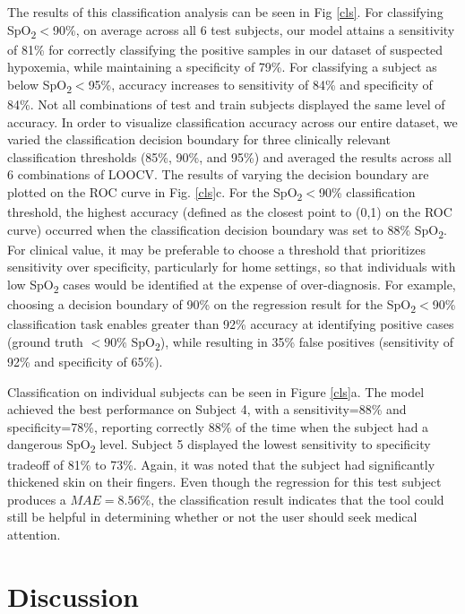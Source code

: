 \documentclass[12pt]{article}
\begin{document}
The results of this classification analysis can be seen in Fig \ref{cls}. For classifying SpO\textsubscript{2}$<$90\%,
on average across all 6 test subjects, our model attains a sensitivity of 81\% for correctly classifying the positive samples in our dataset of suspected hypoxemia,
while maintaining a specificity of 79\%.
For classifying a subject as below SpO\textsubscript{2}$<$95\%, accuracy increases to sensitivity of 84\% and specificity of 84\%.
Not all combinations of test and train subjects displayed the same level of accuracy. In order to visualize classification accuracy across our entire dataset, we varied the classification decision boundary for three clinically relevant classification thresholds (85\%, 90\%, and 95\%) and averaged the results across all 6 combinations of LOOCV.  The results of varying the decision boundary are plotted on the ROC curve in Fig. \ref{cls}c.  For the SpO\textsubscript{2}$<$90\% classification threshold, the highest accuracy (defined as the closest point to (0,1) on the ROC curve) occurred when the classification decision boundary was set to 88\% SpO\textsubscript{2}.  For clinical value, it may be preferable to choose a threshold that prioritizes sensitivity over specificity, particularly for home settings, so that individuals with low SpO\textsubscript{2} cases would be identified at the expense of over-diagnosis.
For example, choosing a decision boundary of 90\% on the regression result for the SpO\textsubscript{2}$<$90\% classification task enables greater than 92\% accuracy at identifying positive cases (ground truth $<90\%$ SpO\textsubscript{2}), while resulting in 35\% false positives (sensitivity of 92\% and specificity of 65\%).

Classification on individual subjects can be seen in Figure \ref{cls}a. 
The model achieved the best performance on Subject 4, with a sensitivity=88\% and specificity=78\%,
reporting correctly 88\% of the time when the subject had a dangerous SpO\textsubscript{2} level. Subject 5 displayed the lowest sensitivity to specificity tradeoff of 81\% to 73\%. Again, it was noted that the subject had significantly thickened skin on their fingers. Even though the regression for this test subject produces a $MAE=8.56\%$, the classification result indicates that the tool could still be helpful in determining whether or not the user should seek medical attention.


\section*{Discussion}
\end{document}
